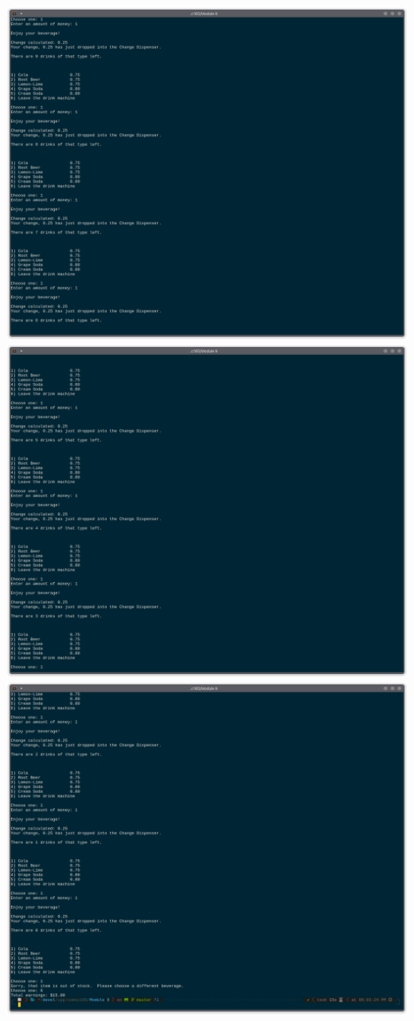 \documentclass[letterpaper, 11pt]{article}
\begin{document}
\clearpage
\includegraphics[scale=0.5]{run2_4.png}
\clearpage
\includegraphics[scale=0.5]{run2_5.png}
\clearpage
\includegraphics[scale=0.5]{run2_6.png}
\clearpage
\end{document}

